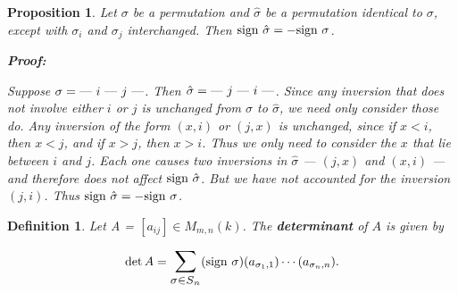 \documentclass{article}
\theoremstyle{colontheorem}
\newtheorem{proposition}[theorem]{Proposition}
\newtheorem{definition}[theorem]{Definition}
\newenvironment{Proposition}
{
	\begin{mdframed}[backgroundcolor=PropPink!10]
	\begin{proposition}
}
{
	\end{proposition}
	\end{mdframed}
	
	\vspace{.15in}
}
\newenvironment{Def}
{
	\begin{mdframed}[backgroundcolor=DefGreen!10]
	\begin{definition}
}
{
	\end{definition}
	\end{mdframed}
	
	\vspace{.15in}
}
\newenvironment{Proof}
{
	\begin{mdframed}[backgroundcolor=ProofPurple!10]
	\textbf{Proof:}%
}
{
	\end{mdframed}
	
	\vspace{.085in}
}
\begin{document}
\begin{Proposition}
	
	Let $\sigma$ be a permutation and $\hat{\sigma}$ be a permutation identical to $\sigma$, except with $\sigma_i$ and $\sigma_j$ interchanged. Then $\textnormal{sign } \hat{\sigma} = -\textnormal{sign } \sigma$.
	
	\begin{Proof}
		Suppose $\sigma = \textnormal{--- } i \textnormal{ --- } j \textnormal{ ---}$. Then $\hat{\sigma} = \textnormal{--- } j \textnormal{ --- } i \textnormal{ ---}$. Since any inversion that does not involve either $i$ or $j$ is unchanged from $\sigma$ to $\hat{\sigma}$, we need only consider those do. Any inversion of the form $(x, i)$ or $(j, x)$ is unchanged, since if $x < i$, then $x < j$, and if $x > j$, then $x > i$. Thus we only need to consider the $x$ that lie between $i$ and $j$. Each one causes two inversions in $\hat{\sigma}$ --- $(j, x)$ and $(x, i)$ --- and therefore does not affect $\textnormal{sign } \hat{\sigma}$. But we have not accounted for the inversion $(j, i)$. Thus $\textnormal{sign } \hat{\sigma} = -\textnormal{sign } \sigma$.
		
	\end{Proof}
	
\end{Proposition}



\begin{Def}
	
	Let A = $[a_{ij}] \in M_{m, n}(k)$. The \textbf{determinant} of $A$ is given by
	
	$$\det A = \scaleto{\sum\limits_{\sigma \in S_n}}{7ex} (\textnormal{sign } \sigma)(a_{\sigma_1, 1}) \cdots (a_{\sigma_n, n}).$$
	
\end{Def}
\end{document}
